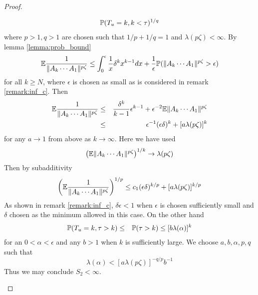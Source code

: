\documentclass{article}
\theoremstyle{remark}
\begin{document}
\begin{proof}
\begin{enumerate}
\begin{eqnarray*}
          \P(T_u = k, k < \tau)^{1/q} \\
      \end{eqnarray*}
      where $p > 1, q > 1$ are chosen such that $1/p + 1/q = 1$ and
      $\lambda(p\zeta) < \infty$. By lemma \ref{lemma:prob_bound}
      \[
      \E {1 \over \|A_k \cdots A_1\|^{p \zeta}} \leq 
      \int_0^\epsilon {1 \over x} \delta^k x^{k-1} dx
      +
      {1 \over \epsilon} \P(\|A_k \cdots A_1\|^{p \zeta} > \epsilon)
      \]
      for all $k \geq N$, where $\epsilon$ is chosen as small as is considered in remark
      \ref{remark:inf_c}. Then
        \begin{eqnarray*}
          \E {1 \over \|A_k \cdots A_1\|^{p \zeta}} &\leq& {\delta^k
            \over k-1} \epsilon^{k-1} + \epsilon^{-2} \E \|A_k \cdots
          A_1\|^{p \zeta} \\
          &\leq& \epsilon^{-1} (\epsilon \delta)^k + [a \lambda(p\zeta)]^k
        \end{eqnarray*}
        for any $a \to 1$ from above as $k \to \infty$. Here we have used
        \[
        \left(
          \E \|A_k \cdots A_1\|^{p \zeta}
        \right)^{1/k} \to \lambda(p\zeta)
        \]
        Then by subadditivity
        \[
        \left(
          \E {
            1 \over 
            \|A_k \cdots A_1\|^{p \zeta}
          }
        \right)^{1/p} \leq c_1 (\epsilon \delta)^{k/p} + [a \lambda(p\zeta)]^{k/p}
        \]
        As shown in remark \ref{remark:inf_c}, $\delta \epsilon < 1$
        when $\epsilon$ is chosen sufficiently small and $\delta$ chosen
        as the minimum allowed in this case. On the other hand
        \begin{eqnarray*}
          \P(T_u = k, \tau > k) &\leq& \P(\tau > k) \leq [b \lambda(\alpha)]^k
        \end{eqnarray*}
        for an $0 < \alpha < \epsilon$ and any $b > 1$ when $k$ is
        sufficiently large. We choose $a, b, \alpha, p, q$ such that
        \[
        \lambda(\alpha) < [a \lambda(p\zeta)]^{-q/p} b^{-1}
        \]
        Thus we may conclude $S_2 < \infty$.


\end{enumerate}
\end{proof}
\end{document}
